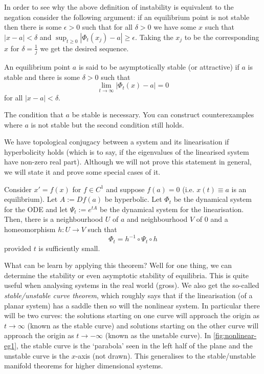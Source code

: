 \begin{remark}
    In order to see why the above definition of instability is equivalent to the negation consider the following argument: if an equilibrium point is not stable then there is some $\epsilon > 0$ such that for all $\delta > 0$ we have some $x$ such that $\left| x - a \right| < \delta$ and $\sup_{t \geq 0} \left| \Phi_t(x_j) - a \right| \geq \epsilon$. Taking the $x_j$ to be the corresponding $x$ for $\delta = \frac{1}{j}$ we get the desired sequence.
\end{remark}
\begin{definition}
An equilibrium point $a$ is said to be asymptotically stable (or attractive) if $a$ is stable and there is some $\delta > 0$ such that $$\lim_{t \to \infty} \left| \Phi_t(x) - a \right| = 0$$
for all $\left| x - a \right| < \delta$.
\end{definition}
\begin{remark}
    The condition that $a$ be stable is necessary. You can construct counterexamples where $a$ is not stable but the second condition still holds.
\end{remark}


We have topological conjugacy between a system and its linearisation if hyperbolicity holds (which is to say, if the eigenvalues of the linearised system have non-zero real part). Although we will not prove this statement in general, we will state it and prove some special cases of it.

\begin{theorem}\label{thm:hartman-grobman}
Consider $x' = f(x)$ for $f \in C^1$ and suppose $f(a) = 0$ (i.e. $x(t) \equiv a$ is an equilibrium). Let $A := Df(a)$ be hyperbolic. Let $\Phi_t$ be the dynamical system for the ODE and let $\Psi_t := e^{tA}$ be the dynamical system for the linearisation. Then, there is a neighbourhood $U$ of $a$ and neighbourhood $V$ of 0 and a homeomorphism $h: U \to V$ such that
$$ \Phi_t = h^{-1} \circ \Psi_t \circ h $$
provided $t$ is sufficiently small.
\end{theorem}

What can be learn by applying this theorem? Well for one thing, we can determine the stability or even asymptotic stability of equilibria. This is quite useful when analysing systems in the real world (gross). We also get the so-called \textit{stable/unstable curve theorem}, which roughly says that if the linearisation (of a planar system) has a saddle then so will the nonlinear system. In particular there will be two curves: the solutions starting on one curve will approach the origin as $t \to \infty$ (known as the stable curve) and solutions starting on the other curve will approach the origin as $t \to -\infty$ (known as the unstable curve). In \autoref{fig:nonlinear-eg1}, the stable curve is the `parabola' seen in the left half of the plane and the unstable curve is the $x$-axis (not drawn). This generalises to the stable/unstable manifold theorems for higher dimensional systems.

